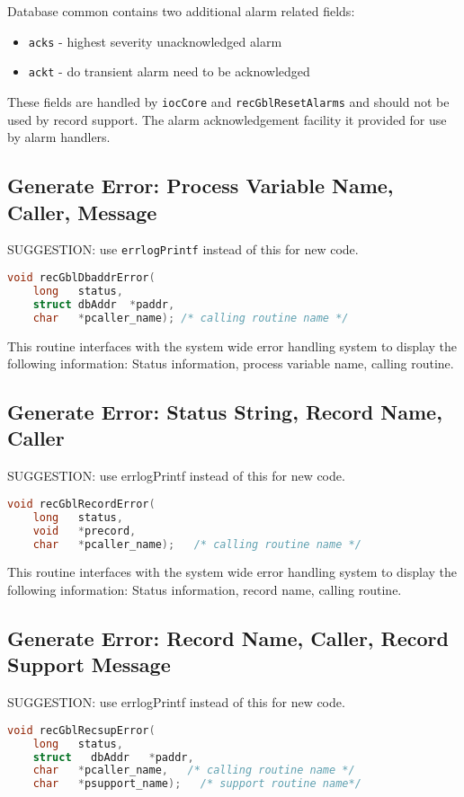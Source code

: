 Database common contains two additional alarm related fields:

\begin{itemize}
\item \verb|acks| - highest severity unacknowledged alarm
\item \verb|ackt| - do transient alarm need to be acknowledged
\end{itemize}

These fields are handled by \verb|iocCore| and \verb|recGblResetAlarms| and should not be used by record support.
The alarm acknowledgement facility it provided for use by alarm handlers.

\subsection{Generate Error: Process Variable Name, Caller, Message}

SUGGESTION: use \verb|errlogPrintf| instead of this for new code.

\begin{lstlisting}[language=C]
void recGblDbaddrError(
    long   status,
    struct dbAddr  *paddr,
    char   *pcaller_name); /* calling routine name */
\end{lstlisting}

This routine interfaces with the system wide error handling system to display the following information:
Status information, process variable name, calling routine.

\subsection{Generate Error: Status String, Record Name, Caller}
SUGGESTION: use errlogPrintf instead of this for new code.
\begin{lstlisting}[language=C]
void recGblRecordError(
    long   status,
    void   *precord,
    char   *pcaller_name);   /* calling routine name */
\end{lstlisting}

This routine interfaces with the system wide error handling system to display the following information:
Status information, record name, calling routine.

\subsection{Generate Error: Record Name, Caller, Record Support Message}
SUGGESTION: use errlogPrintf instead of this for new code.
\begin{lstlisting}[language=C]
void recGblRecsupError(
    long   status,
    struct   dbAddr   *paddr,
    char   *pcaller_name,   /* calling routine name */
    char   *psupport_name);   /* support routine name*/
\end{lstlisting}


